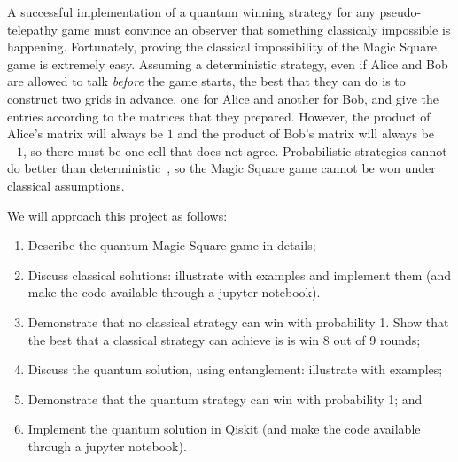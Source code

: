 \documentclass{llncs}
\begin{document}
A successful implementation of a quantum winning strategy for any
pseudo-telepathy game must convince an observer that something
classicaly impossible is happening\cite{brassard:2005}. Fortunately,
proving the classical impossibility of the Magic Square game is
extremely easy. Assuming a deterministic strategy, even if Alice and
Bob are allowed to talk \emph{before} the game starts, the best that
they can do is to construct two grids in advance, one for Alice and
another for Bob, and give the entries according to the matrices
that they prepared. However, the product of Alice's matrix will always
be \(1\) and the product of Bob's matrix will always be \(-1\), so
there must be one cell that does not agree. Probabilistic strategies
cannot do better than deterministic~\cite[Theorem 2]{brassard:2005}, so
the Magic Square game cannot be won under classical assumptions.

We will approach this project as follows:

\begin{enumerate}
\item Describe the quantum Magic Square game in details;
\item Discuss classical solutions: illustrate with examples and
  implement them (and make the code available through a jupyter
  notebook).
\item Demonstrate that no classical strategy can win with probability
  1. Show that the best that a classical strategy can achieve is
  is win 8 out of 9 rounds;
\item Discuss the quantum solution, using entanglement: illustrate
  with examples;
\item Demonstrate that the quantum strategy can win with probability
  1; and
\item Implement the quantum solution in Qiskit
  (and make the code available through a jupyter notebook).
\end{enumerate}

\printbibliography{}
\end{document}
